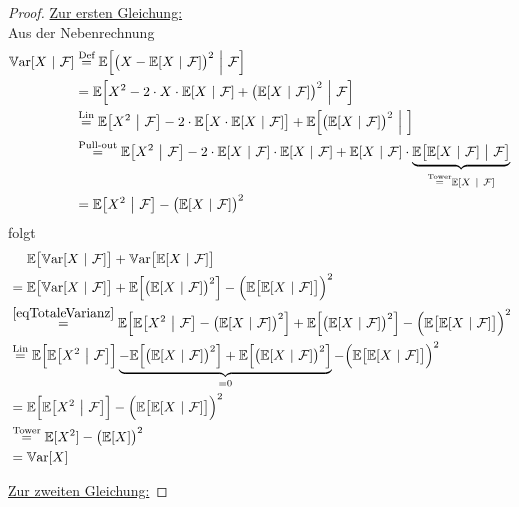 \documentclass[12pt,a4paper]{article}
\begin{document}
\begin{proof}
\underline{Zur ersten Gleichung:}\\
Aus der Nebenrechnung
\begin{align}\label{eqTotaleVarianz}
\Var[X~|~\F]
&\stackeq{\text{Def}}
\E\Big[\big(X-\E[X~|~\F]\big)^2~\Big|~\F\Big]\\\nonumber
&\stackeq{\text{}}
\E\Big[X^2-2\cdot X\cdot \E[X~|~\F]+\big(\E[X~|~\F]\big)^2~\Big|~\F\Big]\\\nonumber
&\stackeq{\text{Lin}}
\E\big[X^2~\big|~\F\big]-2\cdot\E\big[X\cdot\E[X~|~\F]\big]+\E\Big[\big(\E[X~|~\F]\big)^2~\Big|~\Big]\\\nonumber
&\stackeq{\text{Pull-out}}
\E\big[X^2~\big|~\F\big]-2\cdot\E[X~|~\F]\cdot\E[X~|~\F]+
\E[X~|~\F]\cdot\underbrace{\E\big[\E[X~|~\F]~\big|~\F\big]}_{\stackeq{\text{Tower}}\E[X~|~\F]}\\\nonumber
&=
\E\big[X^2~\big|~\F\big]-\big(\E[X~|~\F]\big)^2 
\end{align}
folgt
\begin{align*}
&~~~~\E\big[\Var[X~|~\F]\big]+\Var\big[\E[X~|~\F]\big]\\
&=\E\big[\Var[X~|~\F]\big]+\E\Big[\big(\E[X~|~\F]\big)^2\Big]-\Big(\E\big[\E[X~|~\F]\big]\Big)^2\\
&\stackeq{\eqref{eqTotaleVarianz}}
\E\Big[\E\big[X^2~\big|~\F\big]-\big(\E[X~|~\F]\big)^2 \Big]+
\E\Big[\big(\E[X~|~\F]\big)^2\Big]-\Big(\E\big[\E[X~|~\F]\big]\Big)^2\\
&\stackeq{\text{Lin}}
\E\Big[\E\big[X^2~\big|~\F\big]\Big]\underbrace{-\E\Big[\big(\E[X~|~\F]\big)^2 \Big]+
\E\Big[\big(\E[X~|~\F]\big)^2\Big]}_{=0}-\Big(\E\big[\E[X~|~\F]\big]\Big)^2\\
&=\E\Big[\E\big[X^2~\big|~\F\big]\Big]-\Big(\E\big[\E[X~|~\F]\big]\Big)^2\\
&\stackeq{\text{Tower}}
\E[X^2]-\big(\E[X]\big)^2\\
&=\Var[X]
\end{align*}

\underline{Zur zweiten Gleichung:} 




\end{proof}
\end{document}
